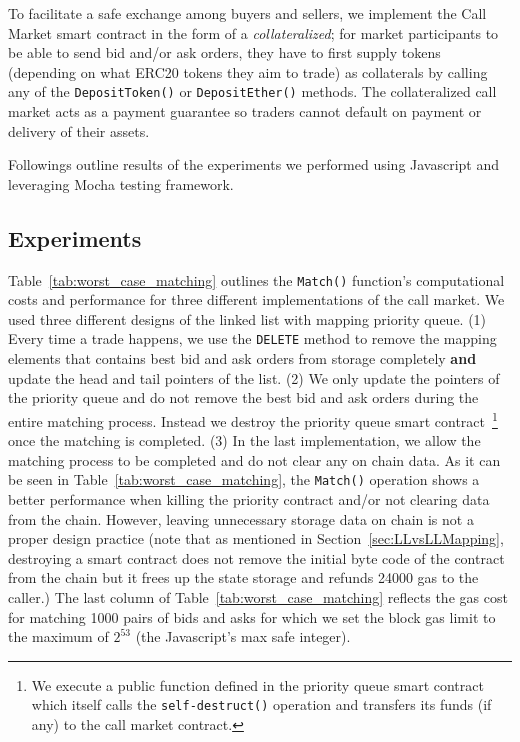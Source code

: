 

To facilitate a safe exchange among buyers and sellers, we implement the Call Market smart contract in the form of a \textit{collateralized}; for market participants to be able to send bid and/or ask orders, they have to first supply tokens (depending on what ERC20 tokens they aim to trade) as collaterals by calling any of the  \texttt{DepositToken()} or \texttt{DepositEther()} methods. The collateralized call market acts as a payment guarantee so traders cannot default on payment or delivery of their assets. 

Followings outline results of the experiments we performed using Javascript and leveraging Mocha testing framework.
 

 \subsection{Experiments}

Table~\ref{tab:worst_case_matching} outlines the \texttt{Match()} function's computational costs and performance for three different implementations of the call market. We used three different designs of the linked list with mapping priority queue. (1) Every time a trade happens, we use the \texttt{DELETE} method to remove the mapping elements that contains best bid and ask orders from storage completely \textbf{and} update the head and tail pointers of the list. (2) We only update the pointers of the priority queue and do not remove the best bid and ask orders during the entire matching process. Instead we destroy the priority queue smart contract~\footnote{We execute a public function defined in the priority queue smart contract which itself calls the \texttt{self-destruct()} operation and transfers its funds (if any) to the call market contract.} once the matching is completed. (3) In the last implementation, we allow the matching process to be completed and do not clear any on chain data. As it can be seen in Table~\ref{tab:worst_case_matching}, the \texttt{Match()} operation shows a better performance when killing the priority contract and/or not clearing data from the chain. However, leaving unnecessary storage data on chain is not a proper design practice (note that as mentioned in Section~\ref{sec:LLvsLLMapping}, destroying a smart contract does not remove the initial byte code of the contract from the chain but it frees up the state storage and refunds 24000 gas to the caller.)
The last column of Table~\ref{tab:worst_case_matching} reflects the gas cost for matching 1000 pairs of bids and asks for which we set the block gas limit to the maximum of  $2^{53}$ (the Javascript's max safe integer).


